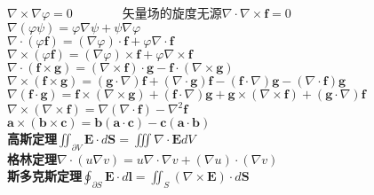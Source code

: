 \documentclass[10pt,a4paper]{article}
\begin{document}
\tiny\begin{multicols}{3}
$\nabla\times\nabla\varphi=0$~~~~~~~~矢量场的旋度无源$\nabla\cdot\nabla\times\bm{f}=0$\\
$\nabla(\varphi\psi)=\varphi\nabla\psi+\psi\nabla\varphi$\\
$\nabla\cdot(\varphi\bm{f})=(\nabla\varphi)\cdot\bm{f}+\varphi\nabla\cdot\bm{f}$\\
$\nabla\times(\varphi\bm{f})=(\nabla\varphi)\times\bm{f}+\varphi\nabla\times\bm{f}$\\
$\nabla\cdot(\bm{f}\times\bm{g})=(\nabla\times\bm{f})\cdot\bm{g}-\bm{f}\cdot(\nabla\times\bm{g})$\\
$\nabla\times(\bm{f}\times\bm{g})=(\bm{g}\cdot\nabla)\bm{f}+(\nabla\cdot\bm{g})\bm{f}-(\bm{f}\cdot\nabla)\bm{g}-(\nabla\cdot\bm{f})\bm{g}$\\
$\nabla(\bm{f}\cdot\bm{g})=\bm{f}\times(\nabla\times\bm{g})+(\bm{f}\cdot\nabla)\bm{g}+\bm{g}\times(\nabla\times\bm{f})+(\bm{g}\cdot\nabla)\bm{f}$\\
$\nabla\times(\nabla\times\bm{f})=\nabla(\nabla\cdot\bm{f})-\nabla^2\bm{f}$\\
$\bm{a}\times(\bm{b}\times\bm{c})=\bm{b}(\bm{a}\cdot\bm{c})-\bm{c}(\bm{a}\cdot\bm{b})$\\
\textbf{高斯定理}$\iint_{\partial V}\bm{E}\cdot d\bm{S}=\iiint\nabla\cdot\bm{E}dV$\\
\textbf{格林定理}$\nabla\cdot(u\nabla v)=u\nabla\cdot\nabla v+(\nabla u)\cdot(\nabla v)$\\
\textbf{斯多克斯定理}$\oint_{\partial S}\bm{E}\cdot d\bm{l}=\iint_S(\nabla\times\bm{E})\cdot d\bm{S}$
\end{multicols}
\end{document}
